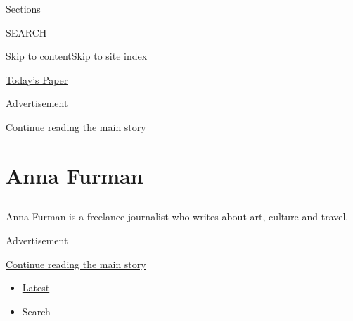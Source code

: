 Sections

SEARCH

\protect\hyperlink{site-content}{Skip to
content}\protect\hyperlink{site-index}{Skip to site index}

\href{https://myaccount.nytimes3xbfgragh.onion/auth/login?response_type=cookie\&client_id=vi}{}

\href{https://www.nytimes3xbfgragh.onion/section/todayspaper}{Today's
Paper}

Advertisement

\protect\hyperlink{after-top}{Continue reading the main story}

\hypertarget{anna-furman}{%
\section{Anna Furman}\label{anna-furman}}

\subsection{}

Anna Furman is a freelance journalist who writes about art, culture and
travel.

Advertisement

\protect\hyperlink{after-mid1}{Continue reading the main story}

\begin{itemize}
\tightlist
\item
  \protect\hyperlink{stream-panel}{Latest}
\item
  Search
\end{itemize}


